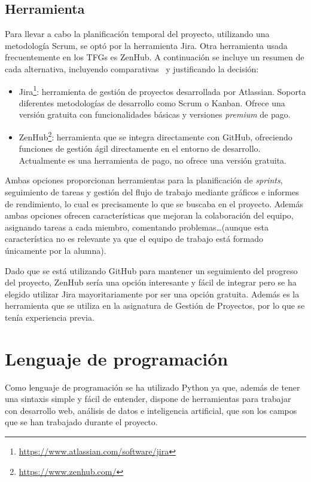 \subsection{Herramienta}
Para llevar a cabo la planificación temporal del proyecto, utilizando una metodología Scrum, se optó por la herramienta Jira. Otra herramienta usada frecuentemente en los TFGs es ZenHub. A continuación se incluye un resumen de cada alternativa, incluyendo comparativas~\cite{jiraVSzenhub} y justificando la decisión:

\begin{itemize}
    \item Jira\footnote{\url{https://www.atlassian.com/software/jira}}: herramienta de gestión de proyectos desarrollada por Atlassian. Soporta diferentes metodologías de desarrollo como Scrum o Kanban. Ofrece una versión gratuita con funcionalidades básicas y versiones \textit{premium} de pago.
    \item ZenHub\footnote{\url{https://www.zenhub.com/}}: herramienta que se integra directamente con GitHub, ofreciendo funciones de gestión ágil directamente en el entorno de desarrollo. Actualmente es una herramienta de pago, no ofrece una versión gratuita.
\end{itemize}
Ambas opciones proporcionan herramientas para la planificación de \textit{sprints}, seguimiento de tareas y gestión del flujo de trabajo mediante gráficos e informes de rendimiento, lo cual es precisamente lo que se buscaba en el proyecto. Además ambas opciones ofrecen características que mejoran la colaboración del equipo, asignando tareas a cada miembro, comentando problemas\ldots (aunque esta característica no es relevante ya que el equipo de trabajo está formado únicamente por la alumna).

Dado que se está utilizando GitHub para mantener un seguimiento del progreso del proyecto, ZenHub sería una opción interesante y fácil de integrar pero se ha elegido utilizar Jira mayoritariamente por ser una opción gratuita. Además es la herramienta que se utiliza en la asignatura de Gestión de Proyectos, por lo que se tenía experiencia previa.




\section{Lenguaje de programación}
Como lenguaje de programación se ha utilizado Python ya que, además de tener una sintaxis simple y fácil de entender, dispone de herramientas para trabajar con desarrollo web, análisis de datos e inteligencia artificial, que son los campos que se han trabajado durante el proyecto.

